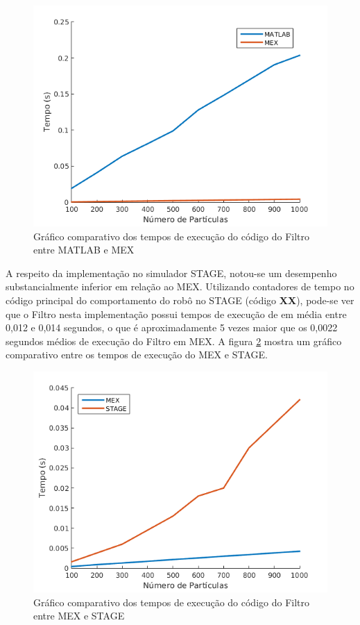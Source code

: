 \documentclass[
	12pt,				%
	openright,			%
	oneside,			%
	a4paper,			%
	english,			%
	french,				%
	spanish,			%
	brazil,				%
	]{abntex2}
\begin{document}
\begin{figure}[h!]
    \centering
    \includegraphics[scale=0.7]{figs/matlab_vs_mex}
    \caption{Gráfico comparativo dos tempos de execução do código do Filtro entre MATLAB e MEX}
    \label{fig:matlab_vs_mex}
\end{figure}

A respeito da implementação no simulador STAGE, notou-se um desempenho substancialmente inferior em relação ao MEX. Utilizando contadores de tempo no código principal do comportamento do robô no STAGE (código \textbf{XX}), pode-se ver que o Filtro nesta implementação possui tempos de execução de em média entre 0,012 e 0,014 segundos, o que é aproximadamente 5 vezes maior que os 0,0022 segundos médios de execução do Filtro em MEX. A figura \ref{fig:mex_vs_stage} mostra um gráfico comparativo entre os tempos de execução do MEX e STAGE.

\begin{figure}[h!]
    \centering
    \includegraphics[scale=0.7]{figs/mex_vs_stage}
    \caption{Gráfico comparativo dos tempos de execução do código do Filtro entre MEX e STAGE}
    \label{fig:mex_vs_stage}
\end{figure}
\end{document}
